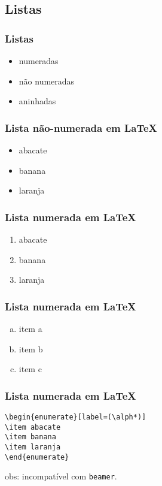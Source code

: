 \subsection{Listas}
\begin{frame}
\frametitle{Listas}
\begin{itemize}
\item numeradas
\item não numeradas
\item aninhadas
\end{itemize}
\end{frame}


\begin{frame}[fragile]
\frametitle{Lista não-numerada em \LaTeX{}}
\begin{LTXexample}
\begin{itemize}
\item abacate
\item banana
\item laranja
\end{itemize}
\end{LTXexample}
\end{frame}


\begin{frame}[fragile]
\frametitle{Lista numerada em \LaTeX{}}
\begin{LTXexample}
\begin{enumerate}
\item abacate
\item banana
\item laranja
\end{enumerate}
\end{LTXexample}
\end{frame}


\begin{frame}[fragile]
\frametitle{Lista numerada em \LaTeX{}}
\begin{LTXexample}
\begin{enumerate}[a)]
 \item item a
 \item item b
 \item item c
\end{enumerate}
\end{LTXexample}
\end{frame}


\begin{frame}[fragile]
\frametitle{Lista numerada em \LaTeX{}}
\begin{verbatim}
\begin{enumerate}[label=(\alph*)]
\item abacate
\item banana
\item laranja
\end{enumerate}
\end{verbatim}

obs: incompatível com \texttt{beamer}.
\end{frame}


